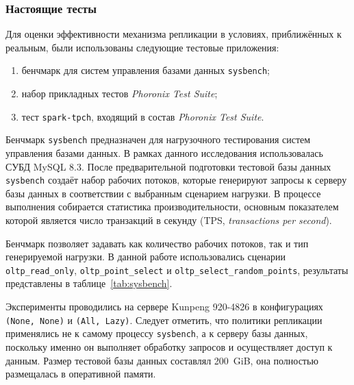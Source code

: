 \subsubsection{Настоящие тесты}

Для оценки эффективности механизма репликации в условиях, приближённых к реальным, были использованы следующие тестовые приложения:
\begin{enumerate}
	\item бенчмарк для систем управления базами данных \texttt{sysbench}\cite{sysbench};
	\item набор прикладных тестов \textit{Phoronix Test Suite}\cite{phoronix};
	\item тест \texttt{spark-tpch}, входящий в состав \textit{Phoronix Test Suite}.
\end{enumerate}

Бенчмарк \texttt{sysbench} предназначен для нагрузочного тестирования систем управления базами данных. В рамках данного исследования использовалась СУБД MySQL 8.3. После предварительной подготовки тестовой базы данных \texttt{sysbench} создаёт набор рабочих потоков, которые генерируют запросы к серверу базы данных в соответствии с выбранным сценарием нагрузки. В процессе выполнения собирается статистика производительности, основным показателем которой является число транзакций в секунду (TPS, \textit{transactions per second}).

Бенчмарк позволяет задавать как количество рабочих потоков, так и тип генерируемой нагрузки. В данной работе использовались сценарии \texttt{oltp\_read\_only}, \texttt{oltp\_point\_select} и \texttt{oltp\_select\_random\_points}, результаты представлены в таблице~\ref{tab:sysbench}.

Эксперименты проводились на сервере Kunpeng 920-4826 в конфигурациях \texttt{(None, None)} и \texttt{(All, Lazy)}. Следует отметить, что политики репликации применялись не к самому процессу \texttt{sysbench}, а к серверу базы данных, поскольку именно он выполняет обработку запросов и осуществляет доступ к данным. Размер тестовой базы данных составлял 200~GiB, она полностью размещалась в оперативной памяти.

